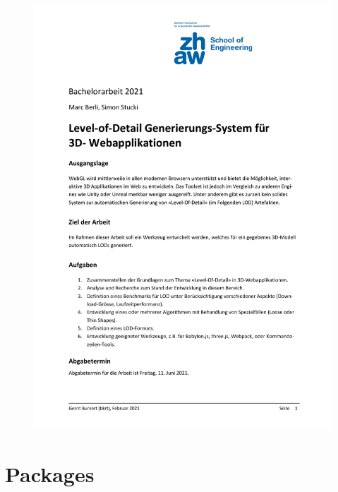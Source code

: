 \begin{figure}[H]
  \centering
\includegraphics[page=2,scale=0.55]{../ressources/Aufgabenstellung.pdf}
\end{figure}


\section{Packages}







